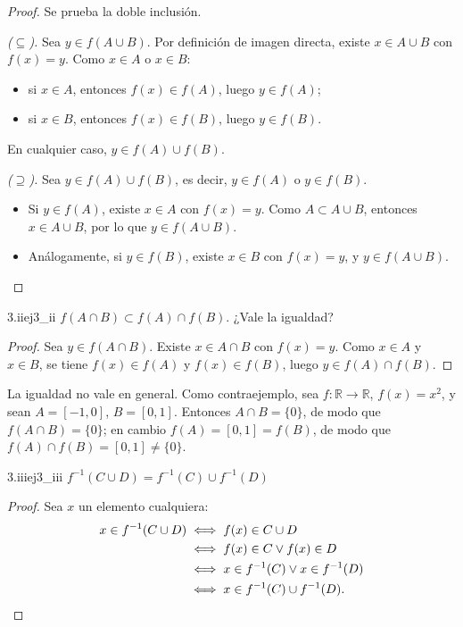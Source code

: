 \documentclass[11pt, a4paper]{article}
\begin{document}
\begin{proof}
Se prueba la doble inclusión.

\textit{($\subseteq$).} Sea $y \in f(A \cup B)$. Por definición de imagen directa, existe
$x \in A \cup B$ con $f(x) = y$. Como $x \in A$ o $x \in B$:
\begin{itemize}
    \item si $x \in A$, entonces $f(x) \in f(A)$, luego $y \in f(A)$;
    \item si $x \in B$, entonces $f(x) \in f(B)$, luego $y \in f(B)$.
\end{itemize}
En cualquier caso, $y \in f(A) \cup f(B)$.

\textit{($\supseteq$).} Sea $y \in f(A) \cup f(B)$, es decir, $y \in f(A)$ o $y \in f(B)$.
\begin{itemize}
    \item Si $y \in f(A)$, existe $x \in A$ con $f(x) = y$. Como $A \subset A \cup B$, entonces
    $x \in A \cup B$, por lo que $y \in f(A \cup B)$.
    \item Análogamente, si $y \in f(B)$, existe $x \in B$ con $f(x) = y$, y $y \in f(A \cup B)$.
\end{itemize}
\end{proof}

\begin{proposicion}{3.ii}{ej3_ii}
$f(A\cap B)\subset f(A)\cap f(B)$. ¿Vale la igualdad?
\end{proposicion}

\begin{proof}
Sea $y \in f(A \cap B)$. Existe $x \in A \cap B$ con $f(x) = y$. Como $x \in A$ y $x \in B$, se tiene
$f(x) \in f(A)$ y $f(x) \in f(B)$, luego $y \in f(A) \cap f(B)$.
\end{proof}

La igualdad no vale en general. Como contraejemplo, sea $f: \mathbb{R} \to \mathbb{R}$, $f(x) = x^2$,
y sean $A = [-1, 0]$, $B = [0, 1]$. Entonces $A \cap B = \{0\}$, de modo que $f(A \cap B) = \{0\}$;
en cambio $f(A) = [0, 1] = f(B)$, de modo que $f(A) \cap f(B) = [0, 1] \neq \{0\}$.

\begin{proposicion}{3.iii}{ej3_iii}
$f^{-1}(C\cup D)=f^{-1}(C)\cup f^{-1}(D)$
\end{proposicion}

\begin{proof}
Sea $x$ un elemento cualquiera:
\begin{align*}
x \in f^{-1}(C \cup D) &\iff f(x) \in C \cup D \\
&\iff f(x) \in C \lor f(x) \in D \\
&\iff x \in f^{-1}(C) \lor x \in f^{-1}(D) \\
&\iff x \in f^{-1}(C) \cup f^{-1}(D). \qedhere
\end{align*}
\end{proof}
\end{document}
